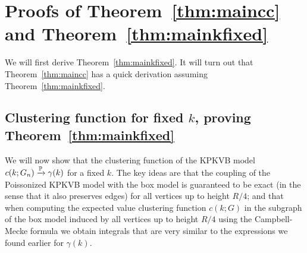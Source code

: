 


\section{Proofs of Theorem~\ref{thm:maincc} and Theorem~\ref{thm:mainkfixed}\label{sec:proofs_fixed_k}}


We will first derive Theorem~\ref{thm:mainkfixed}. It will turn out that Theorem~\ref{thm:maincc} has a quick derivation
assuming Theorem~\ref{thm:mainkfixed}.

\subsection{Clustering function for fixed $k$, proving Theorem~\ref{thm:mainkfixed}}

We will now show that the clustering function of the KPKVB model $c(k;G_n) \xrightarrow{\mathbb{P}} \gamma(k)$ for a fixed $k$. 
The key ideas are that the coupling of the Poissonized KPKVB model with the box model is guaranteed to be exact 
(in the sense that it also preserves edges) for all vertices up to height $R/4$; and that when computing 
the expected value clustering function $c(k;G)$ in the subgraph of the box model induced by all vertices up to height $R/4$
using the Campbell-Mecke formula we obtain integrals that are very similar to the expressions we found earlier for $\gamma(k)$.




